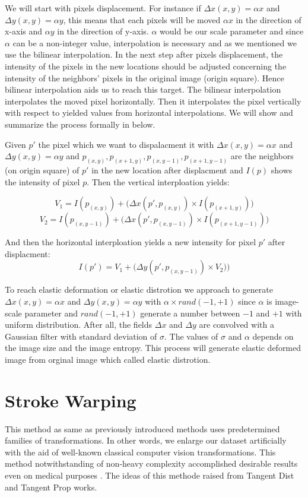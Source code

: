 We will start with pixels displacement. For instance if $\Delta x(x,y)= \alpha x$ and $\Delta y(x,y)= \alpha y$, this means that each pixels will be moved $\alpha x$ in the direction of x-axis and
$\alpha y$ in the direction of y-axis. $\alpha$ would be our scale parameter and since $\alpha$ can be a non-integer value, interpolation is necessary and as we mentioned we use the bilinear
interpolation.  In the next step after pixels displacement, the intensity of the pixels in the new locations should be adjusted concerning the intensity of the neighbors' pixels in the original image
(origin square). Hence bilinear interpolation aids us to reach this target. The bilinear interpolation interpolates the moved pixel horizontally. Then it interpolates the pixel vertically with respect
to yielded values from horizontal interpolations. We will show and summarize the process formally in below.

\begin{definition}{}
  Given $p'$ the pixel which we want to dispalacment it with $\Delta x(x,y)= \alpha x$ and $\Delta y(x,y)= \alpha y$ and $p_{(x,y)}, p_{(x+1,y)}, p_{(x,y-1)}, p_{(x+1,y-1)}$ are the neighbors (on
  origin square) of $p'$ in the new location after displacment and $I(p)$ shows the intensity of pixel $p$. Then the vertical interploation yields:

  $$V_1 = I(p_{(x,y)}) + \big( \Delta x(p', p_{(x,y)}) \times I(p_{(x+1,y)}) \big)$$
  $$V_2 = I(p_{(x,y-1)}) + \big( \Delta x(p', p_{(x,y-1)}) \times I(p_{(x+1,y-1)}) \big)$$

  And then the horizontal interploation yields a new intensity for pixel $p'$ after displacment:
  $$I(p') = V_1 + \big( \Delta y(p', p_{(x,y-1)}) \times V_2) \big)$$
\end{definition}

To reach elastic deformation or elastic distrotion we approach to generate $\Delta x(x,y)= \alpha x$ and $\Delta y(x,y)= \alpha y$ with $\alpha \times rand(-1,+1)$ since $\alpha$ is image-scale parameter
and $rand(-1,+1)$ generate a number between $-1$ and $+1$ with uniform distribution. After all, the
fields $\Delta x$ and $\Delta y$ are convolved with a Gaussian filter with standard deviation of
$\sigma$. The values of $\sigma$ and $\alpha$ depends on the image size and the image entropy. This process will generate elastic deformed image from orginal image which called elastic distrotion.


\section{Stroke Warping}
\label{tit:stroke-warping}
This method as same as previously introduced methods uses predetermined families of transformations.
In other words, we enlarge our dataset artificially with the aid of well-known classical computer
vision transformations. This method notwithstanding of non-heavy complexity accomplished desirable
results even on medical purposes \cite{stroke_tumor}. The ideas of this methode raised from Tangent
Dist \cite{stroke_idea_1992} and Tangent Prop \cite{stroke_idea_1993} works.

